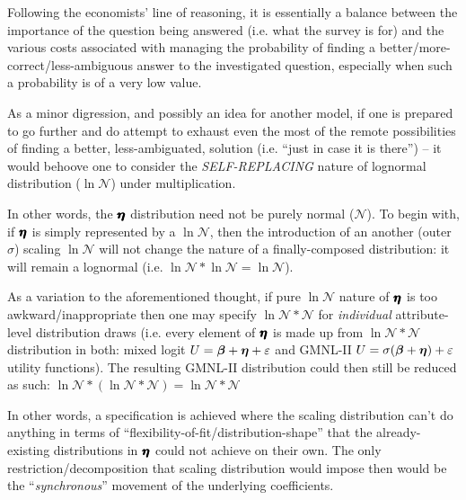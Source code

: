 \documentclass[12pt,a4paper]{article}
\begin{document}
Following the economists' line of reasoning, it is essentially a balance between the importance of the question being answered (i.e. what the survey is for) and the various costs associated with managing the probability of finding a better/more-correct/less-ambiguous answer to the investigated question, especially when such a probability is of a very low value. 

As a minor digression, and possibly an idea for another model, if one is prepared to go further and do attempt to exhaust even the most of the remote possibilities of finding a better, less-ambiguated, solution (i.e. ``just in case it is there'') -- it would behoove one to consider the \textit{SELF-REPLACING} nature of lognormal distribution (\(\ln\mathcal{N}\)) under multiplication. 

In other words, the \(\pmb{\hm{\eta}}\) distribution need not be purely normal (\(\mathcal{N}\)). To begin with, if \(\pmb{\hm{\eta}}\) is simply represented by a \(\ln\mathcal{N}\), then the introduction of an another (outer \(\sigma\)) scaling \(\ln\mathcal{N}\) will not change the nature of a finally-composed distribution: it will remain a lognormal (i.e. \(\ln\mathcal{N}*\ln\mathcal{N}=\ln\mathcal{N}\)).

As a variation to the aforementioned thought, if pure \(\ln\mathcal{N}\) nature of \(\pmb{\hm{\eta}}\) is too awkward/inappropriate then one may specify \(\ln\mathcal{N}*\mathcal{N}\) for \textit{individual} attribute-level distribution draws (i.e. every element of \(\pmb{\hm{\eta}}\) is made up from \(\ln\mathcal{N}*\mathcal{N}\) distribution in both: mixed logit \(U=\hm{\beta}+\hm{\eta} + \varepsilon\) and GMNL-II \(U=\sigma(\hm{\beta}+\hm{\eta}) + \varepsilon\) utility functions). The resulting GMNL-II distribution could then still be reduced as such: \(\ln\mathcal{N}*(\ln\mathcal{N}*\mathcal{N})=\ln\mathcal{N}*\mathcal{N}\)

In other words, a specification is achieved where the scaling distribution can't do anything in terms of ``flexibility-of-fit/distribution-shape'' that the already-existing distributions in \(\pmb{\hm{\eta}}\) could not achieve on their own. The only restriction/decomposition that scaling distribution would impose then would be the ``\textit{synchronous}'' movement of the underlying coefficients. 
\end{document}
